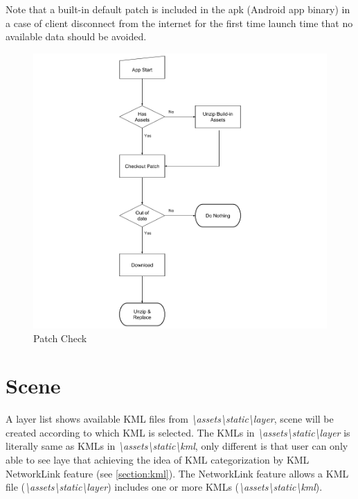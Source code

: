 Note that a built-in default patch is included in the apk (Android app binary) in a case of client disconnect from the internet for the first time launch time that no available data should be avoided.

\begin{figure}[H]
\caption{Patch Check}
\label{fig:patch-check}
\centering
\includegraphics[width=\linewidth]{Figures/patch-check.png}
\decoRule
\end{figure}

\section{Scene}
\label{section:scene}

A layer list shows available KML files from \emph{\textbackslash assets\textbackslash static\textbackslash layer}, scene will be created according to which KML is selected. The KMLs in \emph{\textbackslash assets\textbackslash static\textbackslash layer} is literally same as KMLs in \emph{\textbackslash assets\textbackslash static\textbackslash kml}, only different is that user can only able to see laye that achieving the idea of KML categorization by KML NetworkLink feature (see \ref{section:kml}). The NetworkLink feature allows a KML file (\emph{\textbackslash assets\textbackslash static\textbackslash layer}) includes one or more KMLs (\emph{\textbackslash assets\textbackslash static\textbackslash kml}).

